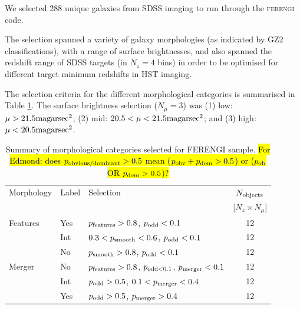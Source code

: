 \documentclass[usenatbib]{mn2e}
\newcommand{\ferengi}{\textsc{ferengi}}
\begin{document}
We selected 288 unique galaxies from SDSS imaging to run through the \ferengi{} code.

The selection spanned a variety of galaxy morphologies (as indicated by GZ2 classifications), with a range of surface brightnesses, and also spanned the redshift range of SDSS targets (in $N_z = 4$ bins) in order to be optimised for different target minimum redshifts in HST imaging. 

 The selection criteria for the different morphological categories is summarised in Table \ref{morphologies}. The surface brightness selection ($N_\mu = 3$) was (1) low: $\mu > 21.5 {\rm mag arsec}^2$;  (2) mid: $20.5 < \mu < 21.5 {\rm mag arsec}^2$; and (3) high: $\mu < 20.5 {\rm mag arsec}^2$. 
 
\begin{table}
\caption{Summary of morphological categories selected for FERENGI sample. \hl{For Edmond: does $p_{\rm obvious/dominant}>0.5$ mean ($p_{\rm obv}+p_{\rm dom}>0.5$) or ($p_{\rm ob}$ OR $p_{\rm dom} >0.5$)?}\label{morphologies}}
\begin{tabular}{lllc}
\hline\hline
Morphology          & Label &  Selection                                                                                            & $N_{\rm objects}$ \\
                    &       &                                                                                                       & [$N_z \times N_\mu$] \\
\hline
Features            & Yes   & $p_{\rm features} > 0.8$, $p_{\rm odd} < 0.1$                                                         & 12 \\ 
                    & Int   & $0.3 < p_{\rm smooth} < 0.6$, $p_{\rm odd} < 0.1$                                                     & 12 \\ 
                    & No    & $p_{\rm smooth} > 0.8$, $p_{\rm odd} < 0.1$                                                           & 12 \\ 
Merger              & No    & $p_{\rm features} > 0.8$, $p_{\rm odd < 0.1}$, $p_{\rm merger} < 0.1$                                 & 12 \\
                    & Int   & $p_{\rm odd} > 0.5$, $0.1< p_{\rm merger} < 0.4$                                                      & 12 \\ 
                    & Yes   & $p_{\rm odd} > 0.5$, $p_{\rm merger} > 0.4$                                                           & 12 \\

\end{tabular}
\end{table}
\end{document}
